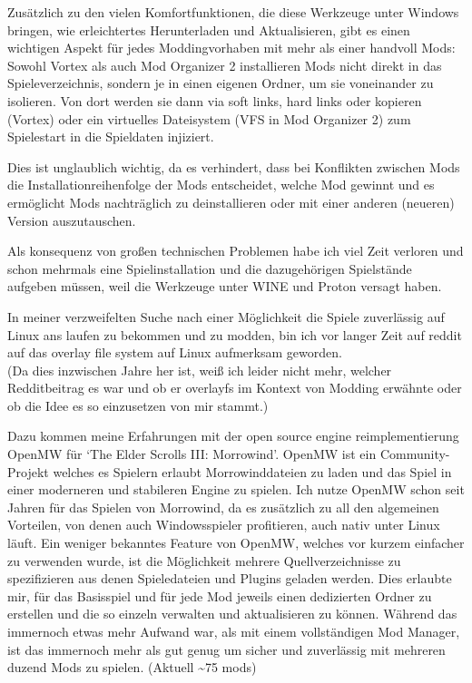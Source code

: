 \documentclass[a4paper,numbers=withenddot,11pt]{scrartcl}
\begin{document}
Zusätzlich zu den vielen Komfortfunktionen, die diese Werkzeuge unter Windows bringen,
wie erleichtertes Herunterladen und Aktualisieren, gibt es einen wichtigen Aspekt
für jedes Moddingvorhaben mit mehr als einer handvoll Mods:\\
Sowohl Vortex als auch Mod Organizer 2 installieren Mods nicht direkt in das
Spieleverzeichnis, sondern je in einen eigenen Ordner, um sie voneinander zu isolieren.
Von dort werden sie dann via soft links, hard links oder kopieren (Vortex) oder
ein virtuelles Dateisystem (VFS in Mod Organizer 2) zum Spielestart in die Spieldaten
injiziert.

Dies ist unglaublich wichtig, da es verhindert, dass bei Konflikten zwischen Mods die
Installationreihenfolge der Mods entscheidet, welche Mod gewinnt und es ermöglicht
Mods nachträglich zu deinstallieren oder mit einer anderen (neueren) Version auszutauschen.

Als konsequenz von großen technischen Problemen habe ich viel Zeit verloren und schon
mehrmals eine Spielinstallation und die dazugehörigen Spielstände aufgeben müssen, weil
die Werkzeuge unter WINE und Proton versagt haben.

In meiner verzweifelten Suche nach einer Möglichkeit die Spiele zuverlässig auf Linux
ans laufen zu bekommen und zu modden, bin ich vor langer Zeit auf reddit auf das overlay
file system auf Linux aufmerksam geworden.\\
(Da dies inzwischen Jahre her ist, weiß ich leider nicht mehr,
welcher Redditbeitrag es war und ob er overlayfs im Kontext von Modding erwähnte
oder ob die Idee es so einzusetzen von mir stammt.)

Dazu kommen meine Erfahrungen mit der open source engine reimplementierung OpenMW
für `The Elder Scrolls III: Morrowind'.
OpenMW ist ein Community-Projekt welches es Spielern erlaubt Morrowinddateien
zu laden und das Spiel in einer moderneren und stabileren Engine zu spielen.
Ich nutze OpenMW schon seit Jahren für das Spielen von Morrowind, da es zusätzlich
zu all den algemeinen Vorteilen, von denen auch Windowsspieler profitieren,
auch nativ unter Linux läuft.
Ein weniger bekanntes Feature von OpenMW, welches vor kurzem einfacher zu verwenden
wurde, ist die Möglichkeit mehrere Quellverzeichnisse zu spezifizieren aus denen
Spieledateien und Plugins geladen werden.
Dies erlaubte mir, für das Basisspiel und für jede Mod jeweils einen dedizierten
Ordner zu erstellen und die so einzeln verwalten und aktualisieren zu können.
Während das immernoch etwas mehr Aufwand war, als mit einem vollständigen
Mod Manager, ist das immernoch mehr als gut genug um sicher und zuverlässig
mit mehreren duzend Mods zu spielen. (Aktuell \~{}75 mods)
\end{document}
